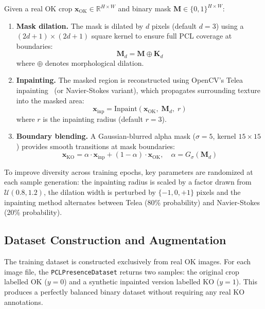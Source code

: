 \documentclass[11pt,a4paper,draft]{article}
\begin{document}
Given a real OK crop $\mathbf{x}_{\mathrm{OK}} \in \mathbb{R}^{H \times W}$ and binary mask $\mathbf{M} \in \{0, 1\}^{H \times W}$:

\begin{enumerate}[nosep]
    \item \textbf{Mask dilation.} The mask is dilated by $d$ pixels (default $d=3$) using a $(2d+1) \times (2d+1)$ square kernel to ensure full PCL coverage at boundaries:
    \begin{equation}
        \mathbf{M}_d = \mathbf{M} \oplus \mathbf{K}_d
    \end{equation}
    where $\oplus$ denotes morphological dilation.
    
    \item \textbf{Inpainting.} The masked region is reconstructed using OpenCV's Telea inpainting~\cite{telea2004inpainting} (or Navier-Stokes variant), which propagates surrounding texture into the masked area:
    \begin{equation}
        \mathbf{x}_{\mathrm{inp}} = \mathrm{Inpaint}(\mathbf{x}_{\mathrm{OK}},\; \mathbf{M}_d,\; r)
    \end{equation}
    where $r$ is the inpainting radius (default $r=3$).
    
    \item \textbf{Boundary blending.} A Gaussian-blurred alpha mask ($\sigma=5$, kernel $15 \times 15$) provides smooth transitions at mask boundaries:
    \begin{equation}
        \mathbf{x}_{\mathrm{KO}} = \alpha \cdot \mathbf{x}_{\mathrm{inp}} + (1 - \alpha) \cdot \mathbf{x}_{\mathrm{OK}}, \quad \alpha = G_\sigma(\mathbf{M}_d)
    \end{equation}
\end{enumerate}

To improve diversity across training epochs, key parameters are randomized at each sample generation: the inpainting radius is scaled by a factor drawn from $\mathcal{U}(0.8, 1.2)$, the dilation width is perturbed by $\{-1, 0, +1\}$ pixels and the inpainting method alternates between Telea (80\% probability) and Navier-Stokes (20\% probability).

\subsection{Dataset Construction and Augmentation}

The training dataset is constructed exclusively from real OK images. For each image file, the \texttt{PCLPresenceDataset} returns two samples: the original crop labelled OK ($y=0$) and a synthetic inpainted version labelled KO ($y=1$). This produces a perfectly balanced binary dataset without requiring any real KO annotations.
\end{document}
